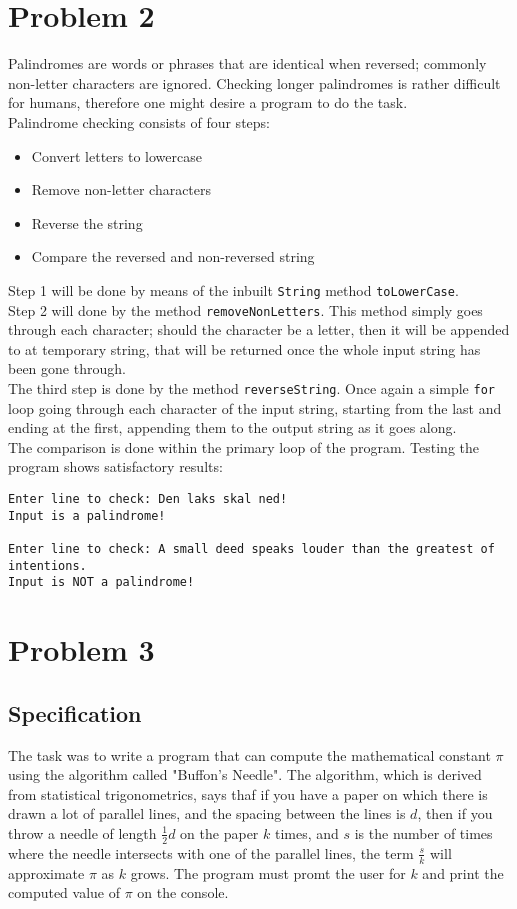 \documentclass{scrartcl}
\newcommand\code[1]{\texttt{#1}}
\begin{document}
\section*{Problem 2}
Palindromes are words or phrases that are identical when reversed; commonly non-letter characters are ignored. Checking longer palindromes is rather difficult for humans, therefore one might desire a program to do the task.\\ Palindrome checking consists of four steps:
\begin{itemize}
\item Convert letters to lowercase
\item Remove non-letter characters
\item Reverse the string
\item Compare the reversed and non-reversed string
\end{itemize}
Step 1 will be done by means of the inbuilt \code{String} method \code{toLowerCase}. \\
Step 2 will done by the method \code{removeNonLetters}. This method simply goes through each character; should the character be a letter, then it will be appended to at temporary string, that will be returned once the whole input string has been gone through.\\
The third step is done by the method \code{reverseString}. Once again a simple \code{for} loop going through each character of the input string, starting from the last and ending at the first, appending them to the output string as it goes along.\\
The comparison is done within the primary loop of the program.
Testing the program shows satisfactory results:
\begin{Verbatim}
Enter line to check: Den laks skal ned!
Input is a palindrome!

Enter line to check: A small deed speaks louder than the greatest of intentions.
Input is NOT a palindrome!
\end{Verbatim}









\section*{Problem 3}
\subsection*{Specification}
The task was to write a program that can compute the mathematical 
constant $\pi$ using the algorithm called "Buffon's Needle".
The algorithm, which is derived from statistical trigonometrics, says
thaf if you have a paper on which there is drawn a lot of parallel
lines, and the spacing between the lines is $d$, then if you throw
a needle of length $\frac{1}{2}d$ on the paper $k$ times, and $s$
is the number of times where the needle intersects with one
of the parallel lines, the term $\frac{s}{k}$ will approximate $\pi$  
as $k$ grows.
The program must promt the user for $k$ and print the computed
value of $\pi$  on the console.
\end{document}
